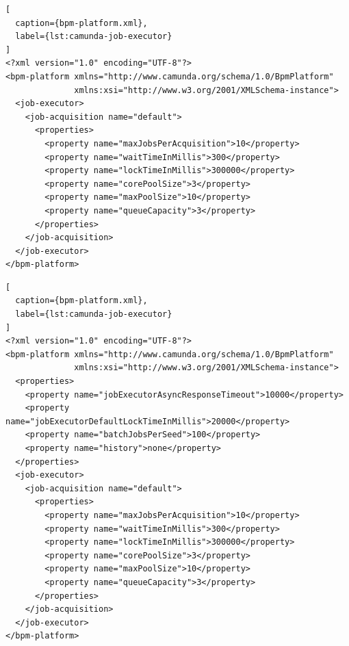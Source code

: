 \label{appendix:camunda-config}

\begin{lstlisting}[
  caption={bpm-platform.xml},
  label={lst:camunda-job-executor}
]
<?xml version="1.0" encoding="UTF-8"?>
<bpm-platform xmlns="http://www.camunda.org/schema/1.0/BpmPlatform"
              xmlns:xsi="http://www.w3.org/2001/XMLSchema-instance">
  <job-executor>
    <job-acquisition name="default">
      <properties>
        <property name="maxJobsPerAcquisition">10</property>
        <property name="waitTimeInMillis">300</property>
        <property name="lockTimeInMillis">300000</property>
        <property name="corePoolSize">3</property>
        <property name="maxPoolSize">10</property>
        <property name="queueCapacity">3</property>
      </properties>
    </job-acquisition>
  </job-executor>
</bpm-platform>
\end{lstlisting}

\begin{lstlisting}[
  caption={bpm-platform.xml},
  label={lst:camunda-job-executor}
]
<?xml version="1.0" encoding="UTF-8"?>
<bpm-platform xmlns="http://www.camunda.org/schema/1.0/BpmPlatform"
              xmlns:xsi="http://www.w3.org/2001/XMLSchema-instance">
  <properties>
    <property name="jobExecutorAsyncResponseTimeout">10000</property>
    <property name="jobExecutorDefaultLockTimeInMillis">20000</property>
    <property name="batchJobsPerSeed">100</property>
    <property name="history">none</property>
  </properties>
  <job-executor>
    <job-acquisition name="default">
      <properties>
        <property name="maxJobsPerAcquisition">10</property>
        <property name="waitTimeInMillis">300</property>
        <property name="lockTimeInMillis">300000</property>
        <property name="corePoolSize">3</property>
        <property name="maxPoolSize">10</property>
        <property name="queueCapacity">3</property>
      </properties>
    </job-acquisition>
  </job-executor>
</bpm-platform>
\end{lstlisting}
